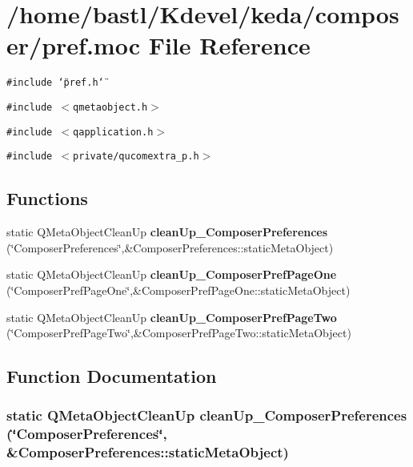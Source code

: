 \section{/home/bastl/Kdevel/keda/composer/pref.moc File Reference}
\label{composer_2pref_8moc}
{\tt \#include \char`\"{}pref.h\char`\"{}}\par
{\tt \#include $<$qmetaobject.h$>$}\par
{\tt \#include $<$qapplication.h$>$}\par
{\tt \#include $<$private/qucomextra\_\-p.h$>$}\par
\subsection*{Functions}
\begin{CompactItemize}
\item 
static QMeta\-Object\-Clean\-Up {\bf clean\-Up\_\-Composer\-Preferences} (\char`\"{}Composer\-Preferences\char`\"{},\&Composer\-Preferences::static\-Meta\-Object)
\item 
static QMeta\-Object\-Clean\-Up {\bf clean\-Up\_\-Composer\-Pref\-Page\-One} (\char`\"{}Composer\-Pref\-Page\-One\char`\"{},\&Composer\-Pref\-Page\-One::static\-Meta\-Object)
\item 
static QMeta\-Object\-Clean\-Up {\bf clean\-Up\_\-Composer\-Pref\-Page\-Two} (\char`\"{}Composer\-Pref\-Page\-Two\char`\"{},\&Composer\-Pref\-Page\-Two::static\-Meta\-Object)
\end{CompactItemize}


\subsection{Function Documentation}
\subsubsection{\setlength{\rightskip}{0pt plus 5cm}static QMeta\-Object\-Clean\-Up clean\-Up\_\-Composer\-Preferences (\char`\"{}Composer\-Preferences\char`\"{}, \&Composer\-Preferences::static\-Meta\-Object)\hspace{0.3cm}{\tt  [static]}}\label{composer_2pref_8moc_7b860a1566cb17f64281c036f6b77dc9}


